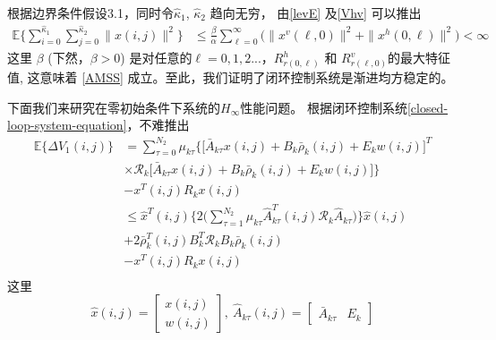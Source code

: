 	根据边界条件假设3.1，同时令$\hat{\kappa}_{1}$, $\hat{\kappa}_{2}$ 趋向无穷， 由\eqref{levE} 及\eqref{Vhv} 可以推出
	\begin{equation}
	\begin{split}
	\mathbb{E}\Big\{\sum_{i=0}^{\hat{\kappa}_{1}}\sum_{j=0}^{\hat{\kappa}_{2}}  \|x(i,j)\|^{2} \Big\} &\leq \frac{\beta}{\alpha} \sum_{\ell=0}^{\infty} \big(  \|x^{v}(\ell,0)\|^{2} + \|x^{h}(0,\ell)\|^{2} \big)<\infty
	\end{split}	
	\end{equation}
	这里 $\beta$ (下然，$\beta>0$) 是对任意的$\ell=0,1,2...$，$R^{h}_{r(0,\ell)}$ 和 $R^{v}_{r(\ell,0)}$的最大特征值,  这意味着 \eqref{AMSS} 成立。至此，我们证明了闭环控制系统是渐进均方稳定的。
	
	下面我们来研究在零初始条件下系统的$H_{\infty}$性能问题。 根据闭环控制系统\eqref{closed-loop-system-equation}，不难推出
	\begin{equation}\label{DETAV1}
	\begin{split}
	\mathbb{E}\{\varDelta V_{1}(i,j) \} &=  \sum_{\tau =0}^{N_{2}}\mu_{k\tau }\Big\{\big[\bar{A}_{k\tau }x(i,j)+B_{k}\bar{\rho}_{k}(i,j)+E_{k}w(i,j)\big]^{T}\\
	&\times \mathcal{R}_{k}\big[\bar{A}_{k\tau }x(i,j)+B_{k}\bar{\rho}_{k}(i,j)+E_{k}w(i,j)\big]\Big\}\\
	&- x^{T}(i,j)R_{k}x(i,j) \\
	&\leq \hat{x}^{T}(i,j) \Big\{2\big(\sum_{\tau =1}^{N_{2}}\mu_{k\tau }\hat{A}^{T}_{k\tau }(i,j)\mathcal{R}_{k}\hat{A}_{k\tau }\big)\Big\}\hat{x}(i,j)\\ &+2\bar{\rho}^{T}_{k}(i,j)B^{T}_{k}\mathcal{R}_{k}B_{k}\bar{\rho}_{k}(i,j) \\
	&-  x^{T}(i,j)R_{k}x(i,j)\\
	\end{split}
	\end{equation}
	这里
	\begin{equation*}
	\hat{x}(i,j)=\begin{bmatrix}
	x(i,j)\\ w(i,j)
	\end{bmatrix},\ \hat{A}_{k\tau }(i,j)=\begin{bmatrix}
	\bar{A}_{k\tau }&E_{k}
	\end{bmatrix}
	\end{equation*}
